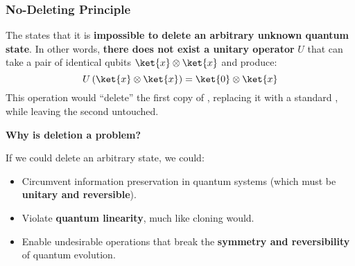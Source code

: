 \subsubsection{No-Deleting Principle}

The  states that it is \textbf{impossible to delete an arbitrary unknown quantum state}. In other words, \textbf{there does not exist a unitary operator} $U$ that can take a pair of identical qubits $\ket{x} \otimes \ket{x}$ and produce:
\begin{equation*}
    U\left(\ket{x} \otimes \ket{x}\right) = \ket{0} \otimes \ket{x}
\end{equation*}
This operation would ``delete'' the first copy of , replacing it with a standard , while leaving the second untouched.

\highspace
\begin{flushleft}
    \textcolor{Green3}{ \textbf{Why is deletion a problem?}}
\end{flushleft}
If we could delete an arbitrary state, we could:
\begin{itemize}
    \item Circumvent information preservation in quantum systems (which must be \textbf{unitary and reversible}).
    \item Violate \textbf{quantum linearity}, much like cloning would.
    \item Enable undesirable operations that break the \textbf{symmetry and reversibility} of quantum evolution.
\end{itemize}

